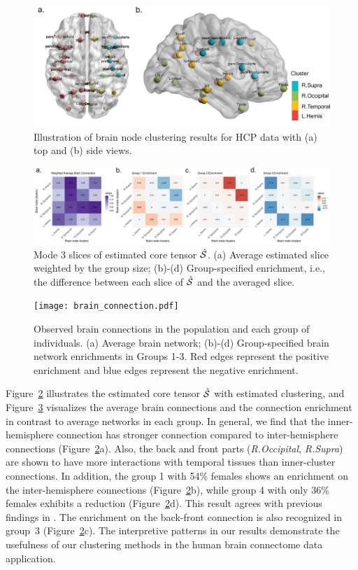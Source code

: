 \documentclass[lettersize,onecolumn,journal]{IEEEtran}
\theoremstyle{definition}
\theoremstyle{definition}
\begin{document}
\begin{figure}[htb]
    \centering
    \includegraphics[width = .8\columnwidth]{brain_node_cluster.pdf}
    \caption{Illustration of brain node clustering results for HCP data with (a) top and (b) side views. }
    \label{fig:cluster_brain}
\end{figure}

\begin{figure}[htb]
    \centering
    \includegraphics[width = 1\textwidth]{est_S_anno.pdf}
    \caption{Mode 3 slices of estimated core tensor $\hat {\mathcal{S}}$. (a) Average estimated slice weighted by the group size; (b)-(d) Group-specified enrichment, i.e., the difference between each slice of $\hat {\mathcal{S}}$ and the averaged slice. }
    \label{fig:ests}
\end{figure}

\begin{figure}[htb]
    \centering
    \texttt{[image: brain\_connection.pdf]}
    \caption{Observed brain connections in the population and each group of individuals. (a) Average brain network; (b)-(d) Group-specified brain network enrichments in Groups 1-3. Red edges represent the positive enrichment and blue edges represent the negative enrichment.}
    \label{fig:brain_conn}
\end{figure}

Figure~\ref{fig:ests} illustrates the estimated core tensor $\hat {\mathcal{S}}$ with estimated clustering, and Figure~\ref{fig:brain_conn} visualizes the average brain connections and the connection enrichment in contrast to average networks in each group. In general, we find that the inner-hemisphere connection has stronger connection compared to inter-hemisphere connections (Figure~\ref{fig:ests}a). Also, the back and front parts (\emph{R.Occipital}, \emph{R.Supra}) are shown to have more interactions with temporal tissues than inner-cluster connections. In addition, the group 1 with 54\% females shows an enrichment on the inter-hemisphere connections (Figure~\ref{fig:ests}b), while group 4 with only 36\% females exhibits a reduction (Figure~\ref{fig:ests}d). This result agrees with previous findings in \cite{hu2021generalized}. The enrichment on the back-front connection is also recognized in group~3 (Figure~\ref{fig:ests}c). The interpretive patterns in our results demonstrate the usefulness of our clustering methods in the human brain connectome data application. 
\end{document}
